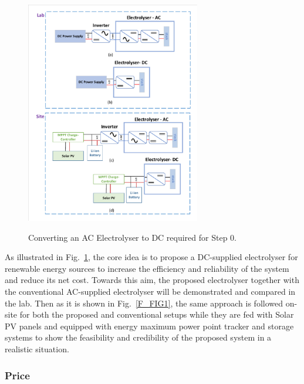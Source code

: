 \documentclass[1pt]{extarticle}
\begin{document}
\begin{figure}[h]
	\centering
	{\includegraphics[width=0.68\textwidth]{images/LabSite.pdf}}
	\caption{Converting an AC Electrolyser to DC required for Step 0.}
	\label{labsite}
\end{figure}

As illustrated in Fig.~\ref{labsite}, the core idea is to propose a DC-supplied electrolyser for renewable energy sources to increase the efficiency and reliability of the system and reduce its net cost. Towards this aim, the proposed electrolyser together with the conventional AC-supplied electrolyser will be demonstrated and compared in the lab. Then as it is shown in Fig.~\ref{F_FIG1}, the same approach is followed on-site for both the proposed and conventional setups while they are fed with Solar PV panels and equipped with energy maximum power point tracker and storage systems to show the feasibility and credibility of the proposed system in a realistic situation.  

\subsubsection{Price}
\end{document}
